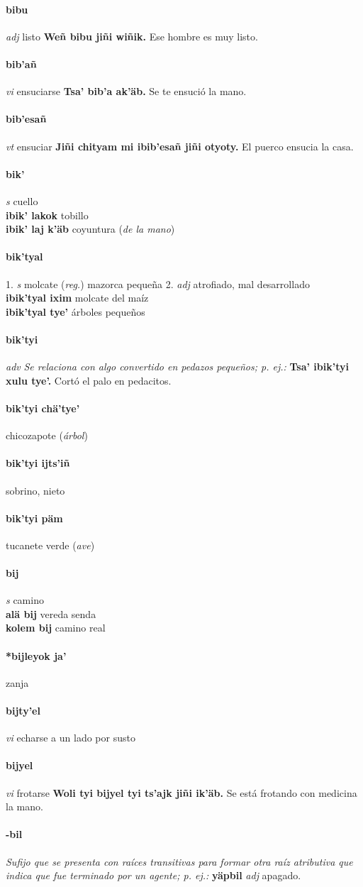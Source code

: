 \documentclass{scrbook}
\newcommand{\entry}[1]{\paragraph{#1}}
\newcommand{\onedefinition}[1]{#1.}
\newcommand{\nontranslationdef}[1]{\textit{#1}}
\newcommand{\partofspeech}[1]{\textit{#1}}
\newcommand{\spanishtranslation}[1]{#1}
\newcommand{\clarification}[1]{(\textit{#1})}
\newcommand{\cholexample}[1]{\textbf{#1}}
\newcommand{\exampletranslation}[1]{#1}
\newcommand{\secondaryentry}[1]{\\\textbf{#1}}
\newcommand{\secondtranslation}[1]{#1}
\begin{document}
\begin{multicols}{2}
\entry{bibu}
\partofspeech{adj}
\spanishtranslation{listo}
\cholexample{Weñ bibu jiñi wiñik.}
\exampletranslation{Ese hombre es muy listo.}

\entry{bib'añ}
\partofspeech{vi}
\spanishtranslation{ensuciarse}
\cholexample{Tsa' bib'a ak'äb.}
\exampletranslation{Se te ensució la mano.}

\entry{bib'esañ}
\partofspeech{vt}
\spanishtranslation{ensuciar}
\cholexample{Jiñi chityam mi ibib'esañ jiñi otyoty.}
\exampletranslation{El puerco ensucia la casa.}

\entry{bik'}
\partofspeech{s}
\spanishtranslation{cuello}
\secondaryentry{ibik' lakok}
\secondtranslation{tobillo}
\secondaryentry{ibik' laj k'äb}
\secondtranslation{coyuntura}
\clarification{de la mano}

\entry{bik'tyal}
\onedefinition{1}
\partofspeech{s}
\spanishtranslation{molcate}
\clarification{reg.}
\spanishtranslation{mazorca pequeña}
\onedefinition{2}
\partofspeech{adj}
\spanishtranslation{atrofiado, mal desarrollado}
\secondaryentry{ibik'tyal ixim}
\secondtranslation{molcate del maíz}
\secondaryentry{ibik'tyal tye'}
\secondtranslation{árboles pequeños}

\entry{bik'tyi}
\partofspeech{adv}
\nontranslationdef{Se relaciona con algo convertido en pedazos pequeños; p. ej.:}
\cholexample{Tsa' ibik'tyi xulu tye'.}
\exampletranslation{Cortó el palo en pedacitos.}

\entry{bik'tyi chä'tye'}
\spanishtranslation{chicozapote}
\clarification{árbol}

\entry{bik'tyi ijts'iñ}
\spanishtranslation{sobrino, nieto}

\entry{bik'tyi päm}
\spanishtranslation{tucanete verde}
\clarification{ave}

\entry{bij}
\partofspeech{s}
\spanishtranslation{camino}
\secondaryentry{alä bij}
\secondtranslation{vereda}
\secondtranslation{senda}
\secondaryentry{kolem bij}
\secondtranslation{camino real}

\entry{*bijleyok ja'}
\spanishtranslation{zanja}

\entry{bijty'el}
\partofspeech{vi}
\spanishtranslation{echarse a un lado por susto}

\entry{bijyel}
\partofspeech{vi}
\spanishtranslation{frotarse}
\cholexample{Woli tyi bijyel tyi ts'ajk jiñi ik'äb.}
\exampletranslation{Se está frotando con medicina la mano.}

\entry{-bil}
\nontranslationdef{Sufijo que se presenta con raíces transitivas para formar otra raíz atributiva que indica que fue terminado por un agente; p. ej.:}
\cholexample{yäpbil}
\partofspeech{adj}
\exampletranslation{apagado.}


\end{multicols}
\end{document}
